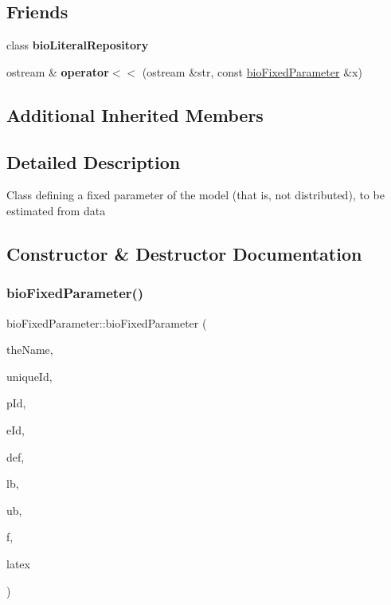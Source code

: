 \subsection*{Friends}
\begin{DoxyCompactItemize}
\item 
\mbox{\label{classbio_fixed_parameter_a6ea664ca897010b84852832942ab0274}} 
class {\bfseries bio\+Literal\+Repository}
\item 
\mbox{\label{classbio_fixed_parameter_a8321153b5329d28798f29638beb7c509}} 
ostream \& {\bfseries operator$<$$<$} (ostream \&str, const \hyperlink{classbio_fixed_parameter}{bio\+Fixed\+Parameter} \&x)
\end{DoxyCompactItemize}
\subsection*{Additional Inherited Members}


\subsection{Detailed Description}
Class defining a fixed parameter of the model (that is, not distributed), to be estimated from data 

\subsection{Constructor \& Destructor Documentation}
\mbox{\label{classbio_fixed_parameter_aec756782840347fa817e369dc8f92f12}} 
\subsubsection{\texorpdfstring{bio\+Fixed\+Parameter()}{bioFixedParameter()}\hspace{0.1cm}{\footnotesize\ttfamily [1/2]}}
{\footnotesize\ttfamily bio\+Fixed\+Parameter\+::bio\+Fixed\+Parameter (\begin{DoxyParamCaption}\item[{pat\+String}]{the\+Name,  }\item[{pat\+U\+Long}]{unique\+Id,  }\item[{pat\+U\+Long}]{p\+Id,  }\item[{pat\+U\+Long}]{e\+Id,  }\item[{pat\+Real}]{def,  }\item[{pat\+Real}]{lb,  }\item[{pat\+Real}]{ub,  }\item[{pat\+Boolean}]{f,  }\item[{pat\+String}]{latex }\end{DoxyParamCaption})\hspace{0.3cm}{\ttfamily [protected]}}

